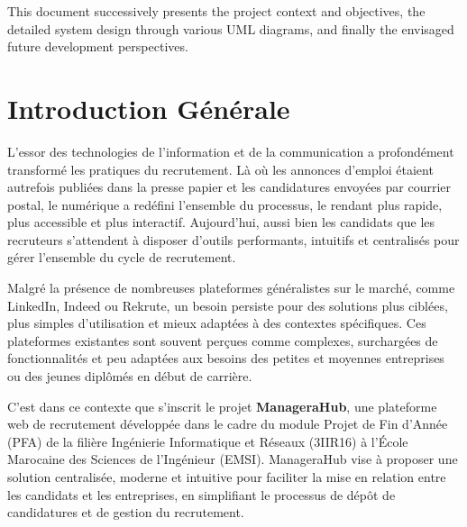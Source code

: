 \documentclass[12pt,a4paper]{report}
\begin{document}
This document successively presents the project context and objectives, the detailed system design through various UML diagrams, and finally the envisaged future development perspectives.

\tableofcontents
\thispagestyle{plain}

\listoffigures
{}

\listoftables
{}

\chapter*{Introduction Générale}

L'essor des technologies de l'information et de la communication a profondément transformé les pratiques du recrutement. Là où les annonces d'emploi étaient autrefois publiées dans la presse papier et les candidatures envoyées par courrier postal, le numérique a redéfini l'ensemble du processus, le rendant plus rapide, plus accessible et plus interactif. Aujourd'hui, aussi bien les candidats que les recruteurs s'attendent à disposer d'outils performants, intuitifs et centralisés pour gérer l'ensemble du cycle de recrutement.

Malgré la présence de nombreuses plateformes généralistes sur le marché, comme LinkedIn, Indeed ou Rekrute, un besoin persiste pour des solutions plus ciblées, plus simples d'utilisation et mieux adaptées à des contextes spécifiques. Ces plateformes existantes sont souvent perçues comme complexes, surchargées de fonctionnalités et peu adaptées aux besoins des petites et moyennes entreprises ou des jeunes diplômés en début de carrière.

C'est dans ce contexte que s'inscrit le projet \textbf{ManageraHub}, une plateforme web de recrutement développée dans le cadre du module Projet de Fin d'Année (PFA) de la filière Ingénierie Informatique et Réseaux (3IIR16) à l'École Marocaine des Sciences de l'Ingénieur (EMSI). ManageraHub vise à proposer une solution centralisée, moderne et intuitive pour faciliter la mise en relation entre les candidats et les entreprises, en simplifiant le processus de dépôt de candidatures et de gestion du recrutement.
\end{document}
